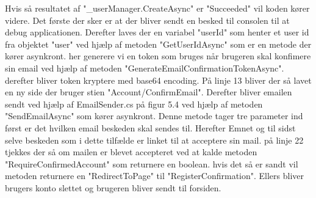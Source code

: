 Hvis så resultatet af "\_userManager.CreateAsync" er "Succeeded" vil koden kører videre. Det første
der sker er at der bliver sendt en besked til consolen til at debug applicationen. Derefter laves der 
en variabel "userId" som henter et user id fra objektet "user" ved hjælp af metoden "GetUserIdAsync" som er en metode der kører asynkront.
her generere vi en token som bruges når brugeren skal konfimere sin email ved hjælp af metoden "GenerateEmailConfirmationTokenAsync".
derefter bliver token kryptere med base64 encoding. På linje 13 bliver der så lavet en ny side der bruger stien "Account/ConfirmEmail".
Derefter bliver emailen sendt ved hjælp af EmailSender.cs på figur 5.4 ved hjælp af metoden "SendEmailAsync" som kører asynkront. Denne metode 
tager tre parameter ind først er det hvilken email beskeden skal sendes til. Herefter Emnet og til sidst selve beskeden som i dette tilfælde
er linket til at acceptere sin mail. på linje 22 tjekkes der så om mailen er blevet accepteret ved at kalde metoden "RequireConfirmedAccount" som
returnere en boolean. hvis det så er sandt vil metoden returnere en  "RedirectToPage" til "RegisterConfirmation". Ellers bliver brugers konto slettet og
brugeren bliver sendt til forsiden. 